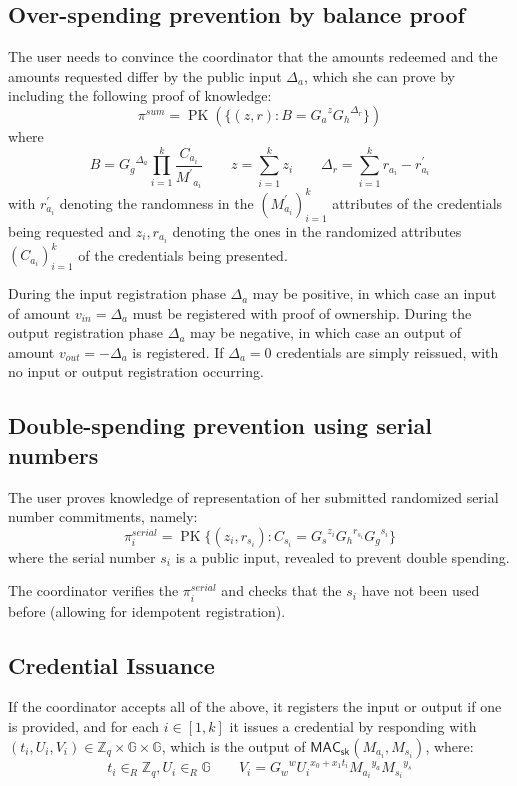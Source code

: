 \documentclass{article}
\begin{document}
\subsection{Over-spending prevention by balance proof}\label{balance}

The user needs to convince the coordinator that the amounts redeemed and the amounts requested differ by the public input $\Delta_{a}$, which she can prove by including the following proof of knowledge:
\[
\pi^{\mathit{sum}} = \operatorname{PK}(\{ (z, r) : B = {G_a}^{z} {G_h}^{\Delta_r} \})
\]
where
\[
B = {G_g}^{\Delta_a} \prod_{i=1}^k \frac{C_{a_i}}{{M^\prime}_{a_i}}
\qquad
z = \sum_{i=1}^k z_i
\qquad
\Delta_r = \sum_{i=1}^k r_{a_i} - r^{\prime}_{a_i}
\]
with $r^{\prime}_{a_i}$ denoting the randomness in the $(M^{\prime}_{a_i})_{i=1}^k$ attributes of the credentials being requested and $z_i, r_{a_i}$ denoting the ones in the randomized attributes $(C_{a_i})_{i=1}^k$ of the credentials being presented.

During the input registration phase $\Delta_{a}$ may be positive, in which case an input of amount $v_{\mathit{in}} = \Delta_{a}$ must be registered with proof of ownership. During the output registration phase $\Delta_{a}$ may be negative, in which case an output of amount $v_{\mathit{out}} = -\Delta_{a}$ is registered. If $\Delta_{a} = 0$ credentials are simply reissued, with no input or output registration occurring.

\subsection{Double-spending prevention using serial numbers}

The user proves knowledge of representation of her submitted randomized serial number commitments, namely:
\[ \pi_{i}^{\mathit{serial}}=\operatorname{PK}\{ (z_i, r_{s_i}): C_{s_i} = {G_s}^{z_i}{G_h}^{r_{s_i}}{G_g}^{s_i} \} \]
where the serial number $s_i$ is a public input, revealed to prevent double spending.

The coordinator verifies the $\pi_{i}^{\mathit{serial}}$ and checks that the $s_i$ have not been used before (allowing for idempotent registration).

\subsection{Credential Issuance}

If the coordinator accepts all of the above, it registers the input or output if one is provided, and for each $i \in [1,k]$ it issues a credential by responding with
$(t_i, U_i, V_i) \in \mathbb{Z}_q \times \mathbb{G} \times \mathbb{G}$,
which is the output of
$\mathsf{MAC}_{\mathsf{sk}}(M_{a_i}, M_{s_i})$,
where:
\[
t_i \in_{R} \mathbb{Z}_{q}, U_i \in_{R} \mathbb{G}
\qquad
V_i={G_w}^{w} {U_i}^{x_{0}+x_{1} t_i}{M_{a_i}}^{y_a} {M_{s_i}}^{y_s}
\]
\end{document}
